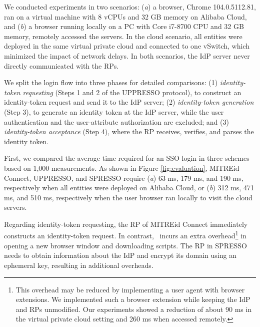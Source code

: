 We conducted experiments in two scenarios: (\emph{a}) a browser, Chrome 104.0.5112.81, ran on a virtual machine with 8 vCPUs and 32 GB memory on Alibaba Cloud, and (\emph{b}) a browser running locally on a PC with Core i7-8700 CPU and 32 GB memory, remotely accessed the servers.
In the cloud scenario, all entities were deployed in the same virtual private cloud and connected to one vSwitch, which minimized the impact of network delays. In both scenarios, the IdP server never directly communicated with the RPs.

 We split the login flow into three phases for detailed comparisons: (1)
{\em identity-token requesting} (Steps 1 and 2 of the UPPRESSO protocol), to construct an identity-token request and send it to the IdP server; (2) {\em identity-token generation} (Step 3), to generate an identity token at the IdP server, while the user authentication and the user-attribute authorization are excluded; and (3) {\em identity-token acceptance} (Step 4), where the RP receives, verifies, and parses the identity token.


First, we compared the average time required for an SSO login in three schemes based on 1,000 measurements. As shown in Figure \ref{fig:evaluation},
MITREid Connect, UPPRESSO, and SPRESSO require (\emph{a}) 63 ms, 179 ms, and 190 ms, respectively when all entities were deployed on Alibaba Cloud,
 or (\emph{b}) 312 ms, 471 ms, and 510 ms, respectively when the user browser ran locally to visit the cloud servers.

Regarding identity-token requesting, %
the RP of MITREid Connect immediately constructs an identity-token request. %
In contrast, \usso~incurs an extra overhead\footnote{This overhead may be reduced %
by implementing a user agent with browser extensions.
We implemented such a browser extension while keeping the IdP and RPs unmodified. Our experiments showed a reduction of about 90 ms in the virtual private cloud setting and 260 ms when accessed remotely.} in opening a new browser window and downloading scripts. The RP in SPRESSO needs to obtain information about the IdP %
and encrypt its domain using an ephemeral key, resulting in additional overheads.

